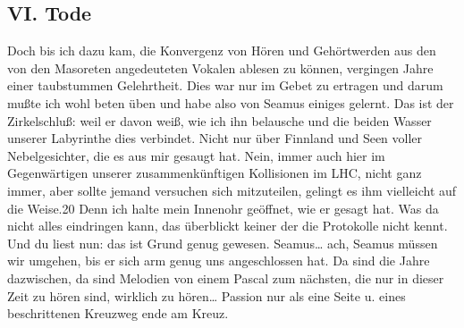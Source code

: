 \documentclass[
]{article}
\author{}
\date{\vspace{-2.5em}}
\begin{document}
\subsection{VI. Tode}\label{vi.-tode}

Doch bis ich dazu kam, die Konvergenz von Hören und Gehörtwerden aus den
von den Masoreten angedeuteten Vokalen ablesen zu können, vergingen
Jahre einer taubstummen Gelehrtheit. Dies war nur im Gebet zu ertragen
und darum mußte ich wohl beten üben und habe also von Seamus einiges
gelernt. Das ist der Zirkelschluß: weil er davon weiß, wie ich ihn
belausche und die beiden Wasser unserer Labyrinthe dies verbindet. Nicht
nur über Finnland und Seen voller Nebelgesichter, die es aus mir gesaugt
hat. Nein, immer auch hier im Gegenwärtigen unserer zusammenkünftigen
Kollisionen im LHC, nicht ganz immer, aber sollte jemand versuchen sich
mitzuteilen, gelingt es ihm vielleicht auf die Weise.20 Denn ich halte
mein Innenohr geöffnet, wie er gesagt hat. Was da nicht alles eindringen
kann, das überblickt keiner der die Protokolle nicht kennt. Und du liest
nun: das ist Grund genug gewesen. Seamus\ldots{} ach, Seamus müssen wir
umgehen, bis er sich arm genug uns angeschlossen hat. Da sind die Jahre
dazwischen, da sind Melodien von einem Pascal zum nächsten, die nur in
dieser Zeit zu hören sind, wirklich zu hören\ldots{} Passion nur als
eine Seite u. eines beschrittenen Kreuzweg ende am Kreuz.
\end{document}
